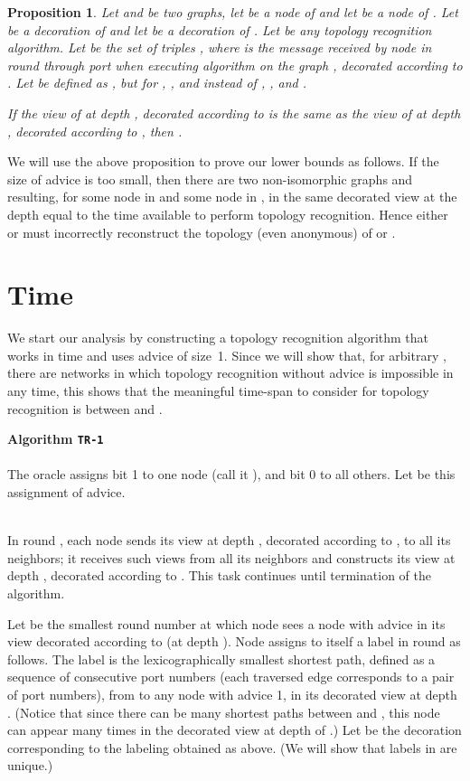 \documentclass{article}
\newtheorem{proposition}{Proposition}[section]
\newcommand{\algo}[1]{
\medskip
\noindent \textbf{Algorithm {\tt #1}}\\
\nopagebreak}
\begin{document}
\begin{proposition}\label{propSameHistory}
Let  and  be two graphs, let  be a node of  and let  be a node of . Let  be a decoration of  and let  be a decoration of .
Let  be any topology recognition algorithm.
Let  be the set of triples , where  is the message received by node  in round  through port  when executing algorithm  on the graph , decorated according to . Let  be defined as , but for , , and  instead of , , and .

If the view of  at depth , decorated according to  is the same as the view of  at depth , decorated according to , then .
\end{proposition}

We will use the above proposition to prove our lower bounds as follows.
If the size of advice is too small, then there are two non-isomorphic graphs  and  resulting, for some node  in  and some node  in , in the same decorated view at the depth equal to the time available to perform topology recognition.
Hence either  or  must incorrectly reconstruct the topology (even anonymous) of  or .


\section{Time  }


We start our analysis by constructing a topology recognition algorithm that works in time  and uses advice of size~1.
Since we will show that, for arbitrary , there are networks in which topology recognition without advice is impossible in any time,
this shows that the meaningful time-span to consider for topology recognition is between  and .


\algo{TR-1}
\\
The oracle assigns bit 1 to one node (call it ), and bit 0 to all others. Let  be this assignment of advice.

\\
In round , each node  sends its view at depth , decorated according to , to all its neighbors;
it receives such views from all its neighbors and constructs its view at depth , decorated according to .
This task continues until termination of the algorithm.

Let  be the smallest round number at which node  sees a node with advice  in its view decorated according to   (at depth ).
Node  assigns to itself a label in round  as follows.
The label  is the lexicographically smallest shortest path, defined as a sequence of consecutive port numbers  (each traversed edge corresponds to a pair of port numbers), from  to any node with advice 1, in its decorated view at depth .
(Notice that since there can be many shortest paths between  and , this node can appear many times in the decorated view at depth  of .)
Let  be the decoration corresponding to the labeling  obtained as above.
(We will show that labels in  are unique.)
\end{document}
